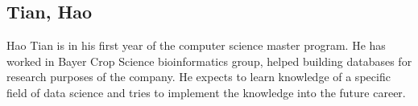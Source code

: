 \subsection{Tian, Hao}

Hao Tian is in his first year of the computer science master program. He has worked in Bayer Crop Science bioinformatics group, helped building databases for research purposes of the company. He expects to learn knowledge of a specific field of data science and tries to implement the knowledge into the future career.
